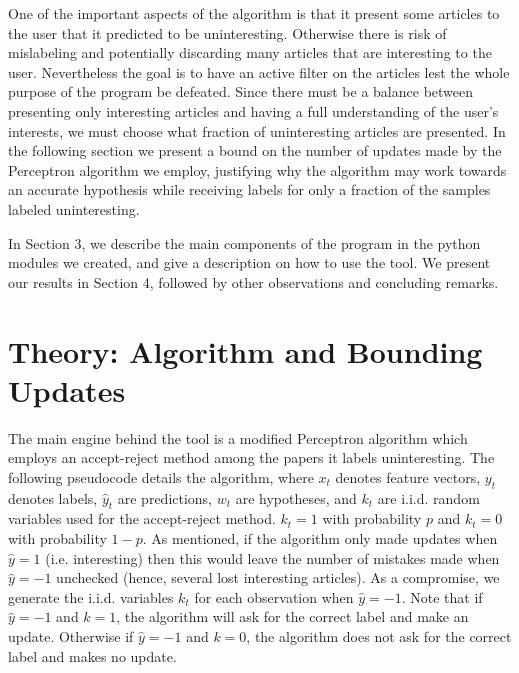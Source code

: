 \documentclass[12pt]{article}
\begin{document}
One of the important aspects of the algorithm is that it present some articles to the user that it predicted to be uninteresting. Otherwise there is risk of mislabeling and potentially discarding many articles that are interesting to the user. Nevertheless the goal is to have an active filter on the articles lest the whole purpose of the program be defeated. Since there must be a balance between presenting only interesting articles and having a full understanding of the user's interests, we must choose what fraction of uninteresting articles are presented. In the following section we present a bound on the number of updates made by the Perceptron algorithm we employ, justifying why the algorithm may work towards an accurate hypothesis while receiving labels for only a fraction of the samples labeled uninteresting.

In Section 3, we describe the main components of the program in the python modules we created, and give a description on how to use the tool. We present our results in Section 4, followed by other observations and concluding remarks.



\section{Theory: Algorithm and Bounding Updates}

The main engine behind the tool is a modified Perceptron algorithm which employs an accept-reject method among the papers it labels uninteresting. The following pseudocode details the algorithm, where $x_t$ denotes feature vectors, $y_t$ denotes labels, $\widehat{y}_t$ are predictions, $w_t$ are hypotheses, and $k_t$ are i.i.d. random variables used for the accept-reject method. $k_t = 1$ with probability $p$ and $k_t = 0$ with probability $1-p$. As mentioned, if the algorithm only made updates when $\widehat{y}=1$ (i.e. interesting) then this would leave the number of mistakes made when $\widehat{y} = -1$ unchecked (hence, several lost interesting articles). As a compromise, we generate the i.i.d. variables $k_t$ for each observation when $\widehat{y} = -1$. Note that if $\widehat{y} = -1$ and $k=1$, the algorithm will ask for the correct label and make an update. Otherwise if $\widehat{y} = -1$ and $k=0$, the algorithm does not ask for the correct label and makes no update.\\
\end{document}
